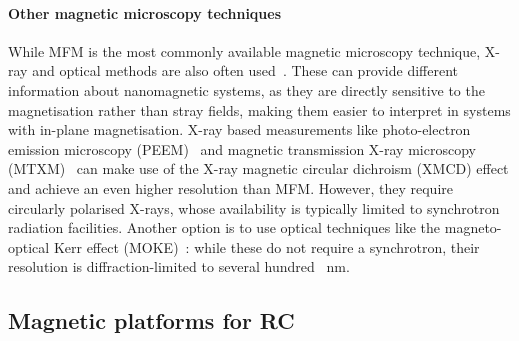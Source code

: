 \paragraph{Other magnetic microscopy techniques}
While MFM is the most commonly available magnetic microscopy technique, X-ray and optical methods are also often used~\cite{DynamicEmergence_NanomagneticSystem}.
These can provide different information about nanomagnetic systems, as they are directly sensitive to the magnetisation rather than stray fields, making them easier to interpret in systems with in-plane magnetisation.
X-ray based measurements like photo-electron emission microscopy (PEEM)~\cite{PEEM} and magnetic transmission X-ray microscopy (MTXM)~\cite{Imaging_MTXM} can make use of the X-ray magnetic circular dichroism (XMCD) effect and achieve an even higher resolution than MFM.
However, they require circularly polarised X-rays, whose availability is typically limited to synchrotron radiation facilities.
Another option is to use optical techniques like the magneto-optical Kerr effect (MOKE)~\cite{KerrFaraday_book}: while these do not require a synchrotron, their resolution is diffraction-limited to several hundred \SI{}{\nano\metre}.

\subsection{Magnetic platforms for RC}\label{sec:1_RC_magnetic} %
